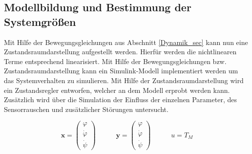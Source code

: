 \subsection{Modellbildung und Bestimmung der Systemgrößen}
Mit Hilfe der Bewegungsgleichungen aus Abschnitt \ref{Dynamik_sec} kann nun eine Zustandsraumdarstellung aufgestellt werden. Hierfür werden die nichtlinearen Terme entsprechend linearisiert. Mit Hilfe der Bewegungsgleichungen bzw. Zustandsraumdarstellung kann ein Simulink-Modell implementiert werden um das Systemverhalten zu simulieren. Mit Hilfe der Zustandsraumdarstellung wird ein Zustandsregler entworfen, welcher an dem Modell erprobt werden kann. Zusätzlich wird über die Simulation der Einfluss der einzelnen Parameter, des Sensorrauschen und zusätzlicher Störungen untersucht.

\begin{equation}
\textbf{x} = \begin{pmatrix}
\varphi \\ \dot{\varphi} \\ \dot{\psi}
\end{pmatrix}
\hspace{35pt}
\textbf{y} = \begin{pmatrix}
\varphi \\ \dot{\varphi} \\ \dot{\psi}
\end{pmatrix}
\hspace{35pt}
u = T_M
\end{equation}

